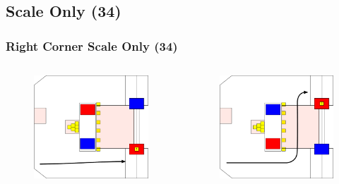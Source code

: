 \documentclass{beamer}
\begin{document}
\subsection{Scale Only (34)}

\begin{frame}
 \frametitle{Right Corner Scale Only \alert{(34)}}
 \begin{columns}
  \begin{figure}
   \includegraphics[scale=0.15]{assets/paths/34_LR}
  \end{figure}
  \begin{figure}
   \includegraphics[scale=0.15]{assets/paths/34_RL}

\end{figure}
\end{columns}
\end{frame}
\end{document}
